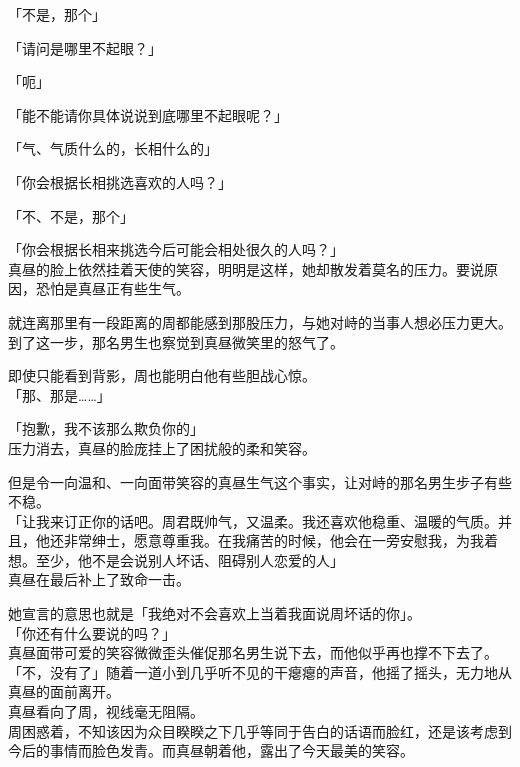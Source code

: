 「不是，那个」

「请问是哪里不起眼？」

「呃」

「能不能请你具体说说到底哪里不起眼呢？」

「气、气质什么的，长相什么的」

「你会根据长相挑选喜欢的人吗？」

「不、不是，那个」

「你会根据长相来挑选今后可能会相处很久的人吗？」\\

真昼的脸上依然挂着天使的笑容，明明是这样，她却散发着莫名的压力。要说原因，恐怕是真昼正有些生气。

就连离那里有一段距离的周都能感到那股压力，与她对峙的当事人想必压力更大。\\

到了这一步，那名男生也察觉到真昼微笑里的怒气了。

即使只能看到背影，周也能明白他有些胆战心惊。\\

「那、那是……」

「抱歉，我不该那么欺负你的」\\

压力消去，真昼的脸庞挂上了困扰般的柔和笑容。

但是令一向温和、一向面带笑容的真昼生气这个事实，让对峙的那名男生步子有些不稳。\\

「让我来订正你的话吧。周君既帅气，又温柔。我还喜欢他稳重、温暖的气质。并且，他还非常绅士，愿意尊重我。在我痛苦的时候，他会在一旁安慰我，为我着想。至少，他不是会说别人坏话、阻碍别人恋爱的人」\\

真昼在最后补上了致命一击。

她宣言的意思也就是「我绝对不会喜欢上当着我面说周坏话的你」。\\

「你还有什么要说的吗？」\\

真昼面带可爱的笑容微微歪头催促那名男生说下去，而他似乎再也撑不下去了。「不，没有了」随着一道小到几乎听不见的干瘪瘪的声音，他摇了摇头，无力地从真昼的面前离开。\\

真昼看向了周，视线毫无阻隔。\\

周困惑着，不知该因为众目睽睽之下几乎等同于告白的话语而脸红，还是该考虑到今后的事情而脸色发青。而真昼朝着他，露出了今天最美的笑容。

